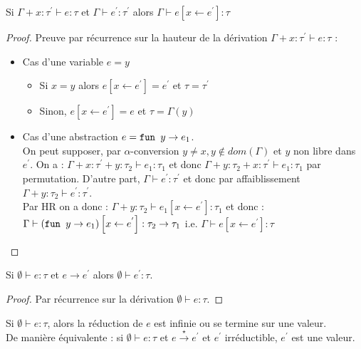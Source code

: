 \documentclass{cours}
\begin{document}
\begin{lemma}
    Si $\Gamma + x : \tau^{'} \vdash e : \tau$ et $\Gamma \vdash e^{'} : \tau^{'}$ alors $\Gamma \vdash e\left[x \leftarrow e^{'}\right] : \tau$
\end{lemma}
\begin{proof}
    Preuve par récurrence sur la hauteur de la dérivation $\Gamma + x : \tau^{'} \vdash e : \tau$ :
    \begin{itemize}
        \item Cas d'une variable $e = y$
        \begin{itemize}
            \item Si $x = y$ alors $e\left[x \leftarrow e^{'}\right] = e^{'}$ et $\tau = \tau^{'}$
            \item Sinon, $e\left[x \leftarrow e^{'}\right] = e$ et $\tau = \Gamma(y)$
        \end{itemize}
        \item Cas d'une abstraction $e = \texttt{fun } y \rightarrow e_{1}$.\\
        On peut supposer, par $\alpha$-conversion $y \neq x, y \notin dom\left(\Gamma\right)$ et $y$ non libre dans $e^{'}$. On a : $\Gamma + x : \tau^{'} + y : \tau_{2} \vdash e_{1} : \tau_{1}$ et donc $\Gamma + y : \tau_{2} + x : \tau^{'} \vdash e_{1} : \tau_{1}$ par permutation. D'autre part, $\Gamma \vdash e^{'} : \tau^{'}$ et donc par affaiblissement $\Gamma + y : \tau_{2} \vdash e^{'} : \tau^{'}$.\\
        Par HR on a donc : $\Gamma + y : \tau_{2} \vdash e_{1}\left[x \leftarrow e^{'}\right] : \tau_{1}$ et donc :$\Gamma \vdash \left(\texttt{fun } y \rightarrow e_{1}\right)\left[x \leftarrow e^{'}\right] : \tau_{2} \rightarrow \tau_{1}$ i.e. $\Gamma \vdash e\left[x \leftarrow e^{'}\right] : \tau$
    \end{itemize}
\end{proof}

\begin{lemma}[Préservation]
    Si $\emptyset \vdash e : \tau$ et $e \rightarrow e^{'}$ alors $\emptyset \vdash e^{'} : \tau$.
\end{lemma}
\begin{proof}
    Par récurrence sur la dérivation $\emptyset \vdash e : \tau$.
\end{proof}

\begin{theorem}
    Si $\emptyset \vdash e : \tau$, alors la réduction de $e$ est infinie ou se termine sur une valeur.\\
    De manière équivalente : si $\emptyset \vdash e : \tau$ et $e \xrightarrow{\star} e^{'}$ et $e^{'}$ irréductible, $e^{'}$ est une valeur. 
\end{theorem}
\end{document}
